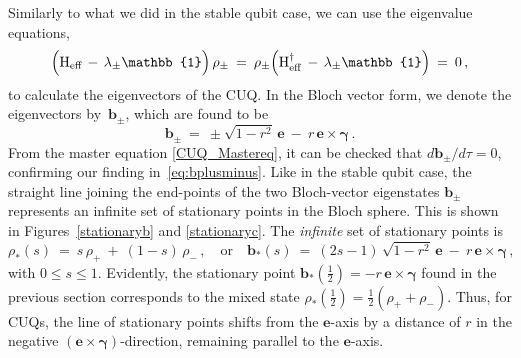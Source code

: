 \documentclass[12pt,a4paper]{article}
\begin{document}
Similarly to what we did in the stable qubit case, we can use the eigenvalue equations,
\begin{equation}
   \label{eq:Heffstat}
    \Big(\mathrm{H}_\text{eff}\, -\, \lambda_{\pm}\mathbb{1}\Big)\,\rho_{\pm}\: =\: \rho_{\pm}\Big(\mathrm{H}^\dagger_{\rm eff}\, -\, \lambda_{\pm}\mathbb{1}\Big)\: =\: 0\,,
\end{equation}
to calculate the eigenvectors of the CUQ. In the Bloch vector form, we denote the eigenvectors by~$\mathbf{b}_\pm$, which are found to be
\begin{equation}
   \label{eq:bplusminus}
    \mathbf{b}_\pm\ =\ \pm\sqrt{1-r^2}\,\mathbf{e}\: -\: r\,\mathbf{e}\times\boldsymbol{\gamma}\,.
\end{equation}
From the master equation \eqref{CUQ_Mastereq}, it can be checked that $d\mathbf{b}_\pm/d\tau =0$, confirming our finding in~\eqref{eq:bplusminus}. Like in the stable qubit case,
 the straight line joining the end-points of the two Bloch-vector eigenstates $\mathbf{b}_\pm$ represents an infinite set of stationary points in the Bloch sphere. This is shown in
Figures~\ref{stationaryb} and \ref{stationaryc}. The {\em infinite} set of stationary points is
\begin{equation}
   \label{eq:stationary}
    \rho_{*}(s)\ =\ s\,\rho_+\: +\: (1-s)\,\rho_-\,,\quad \text{or}\quad \mathbf{b}_{*}(s)\ =\ (2s-1)\,\sqrt{1-r^2}\, \mathbf{e}\: -\: r\,\mathbf{e}\times \boldsymbol{\gamma}\,,
\end{equation}
with $0\leq s\leq 1$. Evidently, the stationary point $\mathbf{b}_* (\frac{1}2) = -r\,\mathbf{e}\times \boldsymbol{\gamma}$ found in the previous section corresponds to the mixed state $\rho_{*}(\frac{1}2) = \frac{1}{2}\left(\rho_++\rho_-\right)$. Thus, for CUQs, the line of stationary points shifts from the $\mathbf{e}$-axis by a distance of $r$ in the negative $(\mathbf{e}\times\boldsymbol{\gamma})$-direction, remaining parallel to the $\mathbf{e}$-axis.
\end{document}
